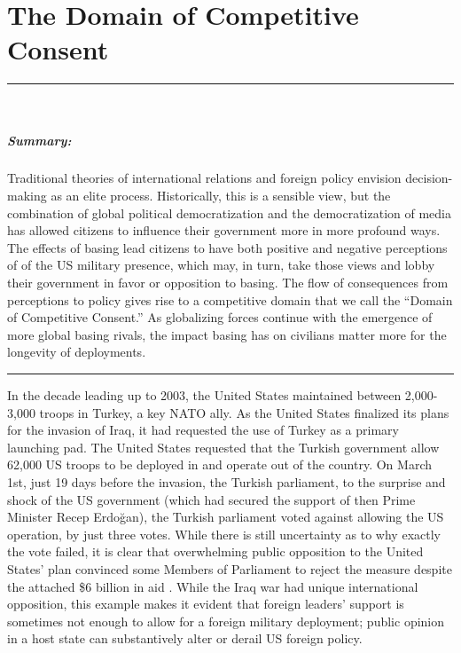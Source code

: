 \chapter{The Domain of Competitive Consent \label{cha:theory}}

\vspace*{-0.85cm}
\rule{\linewidth}{0.10pt} \\[-1.25cm]
{\footnotesize\paragraph{Summary:} Traditional theories of international relations and foreign policy envision decision-making as an elite process. Historically, this is a sensible view, but the combination of global political democratization and the democratization of media has allowed citizens to influence their government more in more profound ways. The effects of basing lead citizens to have both positive and negative perceptions of of the US military presence, which may, in turn, take those views and lobby their government in favor or opposition to basing. The flow of consequences from perceptions to policy gives rise to a competitive domain that we call the ``Domain of Competitive Consent.'' As globalizing forces continue with the emergence of more global basing rivals, the impact basing has on civilians matter more for the longevity of deployments. 
\\[-0.5cm] 
\rule{\linewidth}{0.10pt}
	
	In the decade leading up to 2003, the United States maintained between 2,000-3,000 troops in Turkey, a key NATO ally. As the United States finalized its plans for the invasion of Iraq, it had requested the use of Turkey as a primary launching pad. The United States requested that the Turkish government allow 62,000 US troops to be deployed in and operate out of the country. On March 1st, just 19 days before the invasion, the Turkish parliament, to the surprise and shock of the US government (which had secured the support of then Prime Minister Recep Erdo\u{g}an), the Turkish parliament voted against allowing the US operation, by just three votes. While there is still uncertainty as to why exactly the vote failed, it is clear that overwhelming public opposition to the United States' plan convinced some Members of Parliament to reject the measure despite the attached \$6 billion in aid \cite{CSR2003,cooley2008,altinay2009}. While the Iraq war had unique international opposition, this example makes it evident that foreign leaders' support is sometimes not enough to allow for a foreign military deployment; public opinion in a host state can substantively alter or derail US foreign policy.

}
